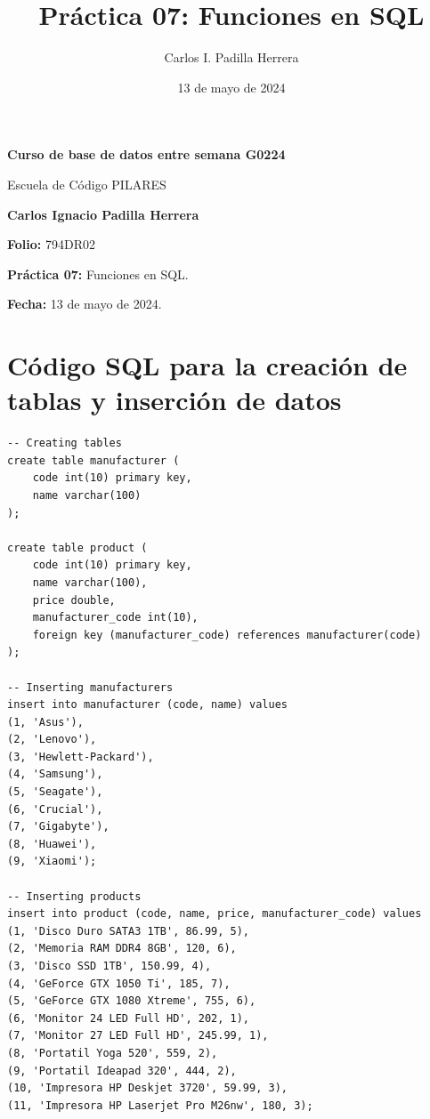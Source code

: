 \documentclass{article}
\title{Práctica 07: Funciones en SQL}
\author{Carlos I. Padilla Herrera}
\date{13 de mayo de 2024}
\begin{document}
\begin{titlepage}
    \centering
    \vspace*{1cm}
    \Huge\textbf{Curso de base de datos entre semana G0224}
    
    \vspace{0.5cm}
    \LARGE Escuela de Código PILARES
    
    \vspace{1.5cm}
    \textbf{Carlos Ignacio Padilla Herrera}
    
    \vspace{2cm}
    \Large\textbf{Folio:} 794DR02
    
    \vspace{0.5cm}
    \Large\textbf{Práctica 07:} Funciones en SQL.
    
    \vfill
    
    \Large\textbf{Fecha:} 13 de mayo de 2024.
    
    \vspace{0.8cm}
\end{titlepage}

\newpage

\section*{Código SQL para la creación de tablas y inserción de datos}

\begin{lstlisting}
-- Creating tables
create table manufacturer (
    code int(10) primary key,
    name varchar(100)
);

create table product (
    code int(10) primary key,
    name varchar(100),
    price double,
    manufacturer_code int(10),
    foreign key (manufacturer_code) references manufacturer(code)
);

-- Inserting manufacturers
insert into manufacturer (code, name) values
(1, 'Asus'),
(2, 'Lenovo'),
(3, 'Hewlett-Packard'),
(4, 'Samsung'),
(5, 'Seagate'),
(6, 'Crucial'),
(7, 'Gigabyte'),
(8, 'Huawei'),
(9, 'Xiaomi');

-- Inserting products
insert into product (code, name, price, manufacturer_code) values
(1, 'Disco Duro SATA3 1TB', 86.99, 5),
(2, 'Memoria RAM DDR4 8GB', 120, 6),
(3, 'Disco SSD 1TB', 150.99, 4),
(4, 'GeForce GTX 1050 Ti', 185, 7),
(5, 'GeForce GTX 1080 Xtreme', 755, 6),
(6, 'Monitor 24 LED Full HD', 202, 1),
(7, 'Monitor 27 LED Full HD', 245.99, 1),
(8, 'Portatil Yoga 520', 559, 2),
(9, 'Portatil Ideapad 320', 444, 2),
(10, 'Impresora HP Deskjet 3720', 59.99, 3),
(11, 'Impresora HP Laserjet Pro M26nw', 180, 3);
\end{lstlisting}
\end{document}
